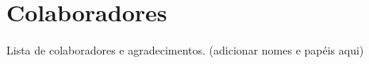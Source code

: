 \chapter*{Colaboradores}
\thispagestyle{empty}

Lista de colaboradores e agradecimentos. (adicionar nomes e papéis aqui)
